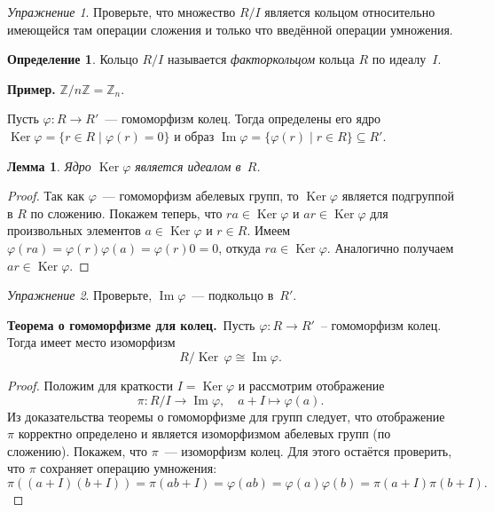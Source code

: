 \documentclass[a4paper,10pt]{amsart}
\newcommand{\Ker}{\mathop{\mathrm{Ker}}}
\renewcommand{\Im}{\mathop{\mathrm{Im}}}
\def\ZZ{{\mathbb Z}}%
\newtheorem{lemma}{Лемма}
\theoremstyle{definition}
\newtheorem{definition}{Определение}
\theoremstyle{remark}
\newtheorem{exercise}{Упражнение}
\begin{document}
\begin{exercise}
Проверьте, что множество $R/I$ является кольцом относительно
имеющейся там операции сложения и только что введённой операции
умножения.
\end{exercise}

\begin{definition}
Кольцо $R/I$ называется {\it факторкольцом} кольца $R$ по
идеалу~$I$.
\end{definition}

\textbf{Пример.} $\ZZ / n \ZZ = \ZZ_n$.

Пусть $\varphi\colon R\to R'$~--- гомоморфизм колец. Тогда
определены его ядро $\Ker \varphi = \lbrace r \in R \mid \varphi(r)
= 0 \rbrace$ и образ $\Im \varphi = \lbrace \varphi(r) \mid r \in R
\rbrace \subseteq R'$.

\begin{lemma}
Ядро $\Ker \varphi$ является идеалом в~$R$.
\end{lemma}

\begin{proof}
Так как $\varphi$~--- гомоморфизм абелевых групп, то $\Ker \varphi$
является подгруппой в $R$ по сложению. Покажем теперь, что $ra \in
\Ker \varphi$ и $ar \in \Ker \varphi$ для произвольных элементов $a
\in \Ker \varphi$ и $r \in R$. Имеем $\varphi(ra) = \varphi(r)
\varphi(a) = \varphi(r) 0 = 0$, откуда $ra \in \Ker \varphi$.
Аналогично получаем $ar \in \Ker \varphi$.
\end{proof}

\begin{exercise}
Проверьте, $\Im \varphi$~--- подкольцо в~$R'$.
\end{exercise}

\smallskip

{\bf Теорема о гомоморфизме для колец.}\ Пусть $\varphi\colon R\to
R'$~-- гомоморфизм колец. Тогда имеет место изоморфизм
$$
R/\Ker\,\varphi\cong\Im\varphi.
$$

\smallskip

\begin{proof}
Положим для краткости $I = \Ker \varphi$ и рассмотрим отображение
$$
\pi \colon R/I \to \Im \varphi, \quad a+I \mapsto \varphi(a).
$$
Из доказательства теоремы о гомоморфизме для групп следует, что
отображение $\pi$ корректно определено и является изоморфизмом
абелевых групп (по сложению). Покажем, что $\pi$~--- изоморфизм
колец. Для этого остаётся проверить, что $\pi$ сохраняет операцию
умножения:
$$
\pi((a+I)(b+I)) = \pi(ab+I) = \varphi(ab) = \varphi(a) \varphi(b) =
\pi(a+I) \pi(b+I).
$$
\end{proof}
\end{document}
